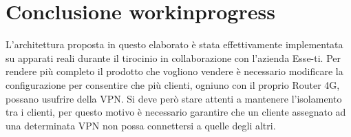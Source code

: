 \chapter{Conclusione workinprogress}

\begin{comment}
Conclusioni

Al momento di scrivere le conclusioni spesso si rimette mano anche all'introduzione poiché sono due sezioni tra loro collegate. Non occorre ripetere quindi le conclusioni già inserite eventualmente nei vari capitoli, ma piuttosto inserire una breve analisi del lavoro svolto, delle problematiche affrontate e delle metodologie per risolverle e indicare possibili futuri sviluppi.

scaletta
    1. sta tesi è una guida implementativa
    2. sta architettura è stata implementata su apparati reali
    3. per la tesi l'architettura è stata simulata
        1. quindi ci stanno delle differenze, es ho usato openwrt stock
    4. evoluzione futura multi-istanza usando una pki perogni processo vpn


\end{comment}

L'architettura proposta in questo elaborato è stata effettivamente implementata su apparati reali durante il tirocinio in collaborazione con l'azienda Esse-ti. Per rendere più completo il prodotto che vogliono vendere è necessario modificare la configurazione per consentire che più clienti, ogniuno con il proprio Router 4G, possano usufrire della VPN. Si deve però stare attenti a mantenere l'isolamento tra i clienti, per questo motivo è necessario garantire che un cliente assegnato ad una determinata VPN non possa connettersi a quelle degli altri.